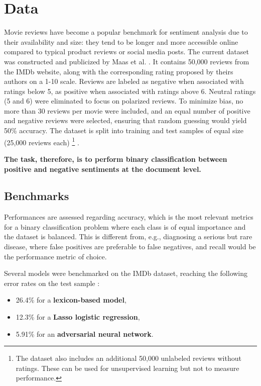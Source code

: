 \documentclass{article}
\begin{document}
\section{Data}

Movie reviews have become a popular benchmark for sentiment analysis due to their availability and size: they tend to be longer and more accessible online compared to typical product reviews or social media posts. The current dataset was constructed and publicized by Maas et al. \citep{maas_learning_2011}. It contains 50,000 reviews from the IMDb website, along with the corresponding rating proposed by theirs authors on a 1-10 scale. Reviews are labeled as negative when associated with ratings below 5, as positive when associated with ratings above 6. Neutral ratings (5 and 6) were eliminated to focus on polarized reviews. To minimize bias, no more than 30 reviews per movie were included, and an equal number of positive and negative reviews were selected, ensuring that random guessing would yield 50\% accuracy. The dataset is split into training and test samples of equal size (25,000 reviews each) 
\footnote{The dataset also includes an additional 50,000 unlabeled reviews without ratings. These can be used for unsupervised learning but not to measure performance.}
.

\textbf{The task, therefore, is to perform binary classification between positive and negative sentiments at the document level.}

\subsection{Benchmarks}

Performances are assessed regarding accuracy, which is the most relevant metrics for a binary classification problem where each class is of equal importance and the dataset is balanced. This is different from, e.g., diagnosing a serious but rare disease, where false positives are preferable to false negatives, and recall would be the performance metric of choice.

Several models were benchmarked on the IMDb dataset, reaching the following error rates on the test sample \citep{stine_sentiment_2019}:
\begin{itemize}
    \item 26.4\% for a \textbf{lexicon-based model},
	\item 12.3\% for a \textbf{Lasso logistic regression},
	\item 5.91\% for an \textbf{adversarial neural network}.
\end{itemize}
\end{document}

